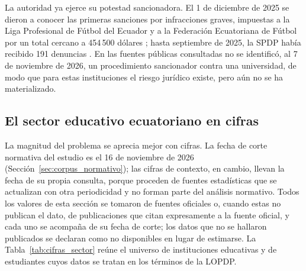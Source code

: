 La autoridad ya ejerce su potestad sancionadora. El 1 de diciembre de 2025 se dieron a conocer las primeras sanciones por infracciones graves, impuestas a la Liga Profesional de Fútbol del Ecuador y a la Federación Ecuatoriana de Fútbol por un total cercano a 454\,500 dólares \cite{revelo2025sanciones,ecija2025sanciones}; hasta septiembre de 2025, la SPDP había recibido 191 denuncias \cite{almeida2025cero}. En las fuentes públicas consultadas no se identificó, al 7 de noviembre de 2026, un procedimiento sancionador contra una universidad, de modo que para estas instituciones el riesgo jurídico existe, pero aún no se ha materializado.

\subsection{El sector educativo ecuatoriano en cifras}
\label{sec:cifras_sector}

La magnitud del problema se aprecia mejor con cifras. La fecha de corte normativa del estudio es el 16 de noviembre de 2026 (Sección~\ref{sec:corpus_normativo}); las cifras de contexto, en cambio, llevan la fecha de su propia consulta, porque proceden de fuentes estadísticas que se actualizan con otra periodicidad y no forman parte del análisis normativo. Todos los valores de esta sección se tomaron de fuentes oficiales o, cuando estas no publican el dato, de publicaciones que citan expresamente a la fuente oficial, y cada uno se acompaña de su fecha de corte; los datos que no se hallaron publicados se declaran como no disponibles en lugar de estimarse. La Tabla~\ref{tab:cifras_sector} reúne el universo de instituciones educativas y de estudiantes cuyos datos se tratan en los términos de la LOPDP.

